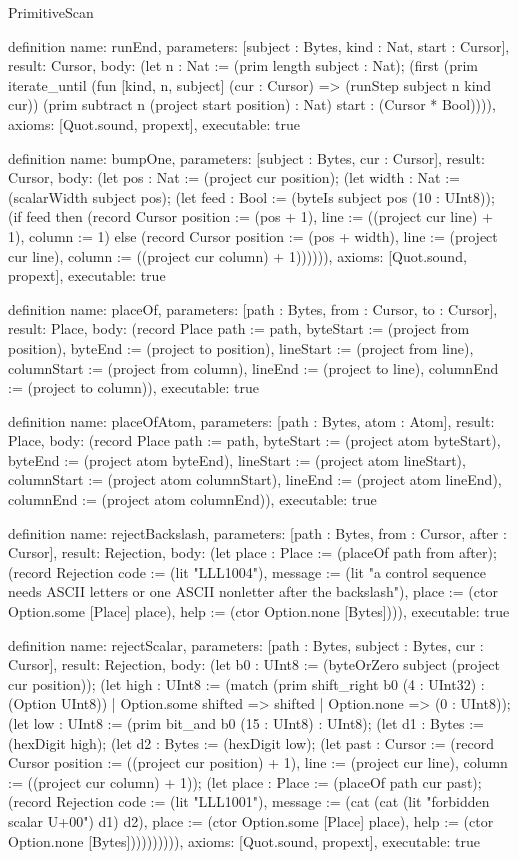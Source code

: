 \begin{lexlean}{PrimitiveScan}
\begin{semanticmodule}
definition{
  name: runEnd,
  parameters: [subject : Bytes, kind : Nat, start : Cursor],
  result: Cursor,
  body: (let n : Nat := (prim length subject : Nat); (first (prim iterate_until (fun [kind, n, subject] (cur : Cursor) => (runStep subject n kind cur)) (prim subtract n (project start position) : Nat) start : (Cursor * Bool)))),
  axioms: [Quot.sound, propext],
  executable: true
}

definition{
  name: bumpOne,
  parameters: [subject : Bytes, cur : Cursor],
  result: Cursor,
  body: (let pos : Nat := (project cur position); (let width : Nat := (scalarWidth subject pos); (let feed : Bool := (byteIs subject pos (10 : UInt8)); (if feed then (record Cursor {position := (pos + 1), line := ((project cur line) + 1), column := 1}) else (record Cursor {position := (pos + width), line := (project cur line), column := ((project cur column) + 1)}))))),
  axioms: [Quot.sound, propext],
  executable: true
}

definition{
  name: placeOf,
  parameters: [path : Bytes, from : Cursor, to : Cursor],
  result: Place,
  body: (record Place {path := path, byteStart := (project from position), byteEnd := (project to position), lineStart := (project from line), columnStart := (project from column), lineEnd := (project to line), columnEnd := (project to column)}),
  executable: true
}

definition{
  name: placeOfAtom,
  parameters: [path : Bytes, atom : Atom],
  result: Place,
  body: (record Place {path := path, byteStart := (project atom byteStart), byteEnd := (project atom byteEnd), lineStart := (project atom lineStart), columnStart := (project atom columnStart), lineEnd := (project atom lineEnd), columnEnd := (project atom columnEnd)}),
  executable: true
}

definition{
  name: rejectBackslash,
  parameters: [path : Bytes, from : Cursor, after : Cursor],
  result: Rejection,
  body: (let place : Place := (placeOf path from after); (record Rejection {code := (lit "LLL1004"), message := (lit "a control sequence needs ASCII letters or one ASCII nonletter after the backslash"), place := (ctor Option.some [Place] place), help := (ctor Option.none [Bytes])})),
  executable: true
}

definition{
  name: rejectScalar,
  parameters: [path : Bytes, subject : Bytes, cur : Cursor],
  result: Rejection,
  body: (let b0 : UInt8 := (byteOrZero subject (project cur position)); (let high : UInt8 := (match (prim shift_right b0 (4 : UInt32) : (Option UInt8))
    | Option.some shifted => shifted
    | Option.none => (0 : UInt8)); (let low : UInt8 := (prim bit_and b0 (15 : UInt8) : UInt8); (let d1 : Bytes := (hexDigit high); (let d2 : Bytes := (hexDigit low); (let past : Cursor := (record Cursor {position := ((project cur position) + 1), line := (project cur line), column := ((project cur column) + 1)}); (let place : Place := (placeOf path cur past); (record Rejection {code := (lit "LLL1001"), message := (cat (cat (lit "forbidden scalar U+00") d1) d2), place := (ctor Option.some [Place] place), help := (ctor Option.none [Bytes])})))))))),
  axioms: [Quot.sound, propext],
  executable: true
}


\end{semanticmodule}
\end{lexlean}
